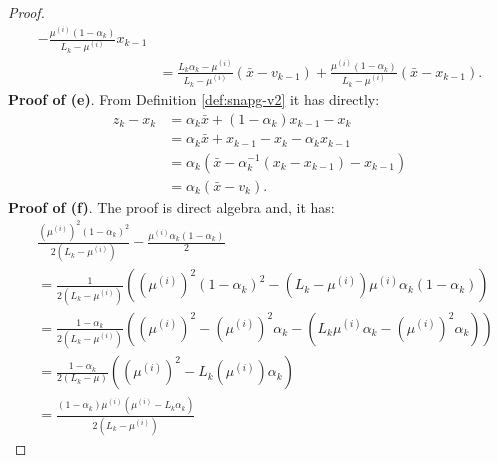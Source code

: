 \documentclass[12pt]{article}
\begin{document}
\begin{proof}
\begin{align*}
                - \frac{\mu^{(i)}(1 - \alpha_k)}{L_k - \mu^{(i)}} x_{k - 1}
                \\
                &= \frac{L_k\alpha_k - \mu^{(i)}}{L_k - \mu^{(i)}}(\bar x - v_{k - 1})
                + \frac{\mu^{(i)}(1 - \alpha_k)}{L_k - \mu^{(i)}}(\bar x - x_{k - 1}).
            \end{align*}
            \textbf{Proof of (e)}.
            From Definition \ref{def:snapg-v2} it has directly: 
            \begin{align*}
                z_k - x_k &= \alpha_k \bar x + (1 - \alpha_k)x_{k - 1} - x_k
                \\
                &= \alpha_k \bar x + x_{k - 1} - x_k - \alpha_k x_{k - 1}
                \\
                &= \alpha_k(\bar x - \alpha_k^{-1}(x_k - x_{k - 1}) - x_{k - 1})
                \\
                &= \alpha_k (\bar x - v_k).
            \end{align*}
            \textbf{Proof of (f)}.
            The proof is direct algebra and, it has: 
            {\small\allowdisplaybreaks
            \begin{align*}
                & \frac{\left(\mu^{(i)}\right)^2(1 - \alpha_k)^2}{2(L_k - \mu^{(i)})} 
                - \frac{\mu^{(i)}\alpha_k(1 - \alpha_k)}{2}
                \\
                &= 
                \frac{1}{2\left(L_k - \mu^{(i)}\right)}
                \left(
                    \left(\mu^{(i)}\right)^2(1 - \alpha_k)^2
                    - \left(L_k - \mu^{(i)}\right)\mu^{(i)} \alpha_k(1 - \alpha_k)
                \right)
                \\
                &= \frac{1 - \alpha_k}{2\left(L_k - \mu^{(i)}\right)}\left(
                    \left(\mu^{(i)}\right)^2 
                    - \left(\mu^{(i)}\right)^2\alpha_k 
                    - \left(L_k \mu^{(i)} \alpha_k - \left(\mu^{(i)}\right)^2 \alpha_k\right)
                \right)
                \\
                &= 
                \frac{1 - \alpha_k}{2(L_k - \mu)}\left(
                    \left(\mu^{(i)}\right)^2 - L_k\left(\mu^{(i)}\right)\alpha_k
                \right)
                \\
                &= 
                \frac{(1 - \alpha_k)\mu^{(i)}\left(\mu^{(i)} - L_k\alpha_k\right)}
                {2\left(L_k - \mu^{(i)}\right)}

\end{align*}}
\end{proof}
\end{document}
